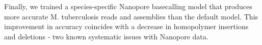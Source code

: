 Finally, we trained a species-specific Nanopore basecalling model that produces more accurate M. tuberculosis reads and assemblies than the default model. This improvement in accuracy coincides with a decrease in homopolymer insertions and deletions - two known systematic issues with Nanopore data.









